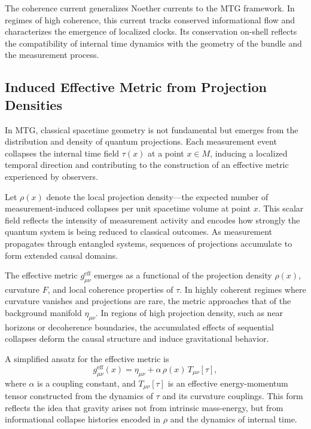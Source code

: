 \documentclass[11pt]{article}
\begin{document}
The coherence current generalizes Noether currents to the MTG framework. In regimes of high coherence, this current tracks conserved informational flow and characterizes the emergence of localized clocks. Its conservation on-shell reflects the compatibility of internal time dynamics with the geometry of the bundle and the measurement process.


\subsection{Induced Effective Metric from Projection Densities}

In MTG, classical spacetime geometry is not fundamental but emerges from the distribution and density of quantum projections. Each measurement event collapses the internal time field \( \tau(x) \) at a point \( x \in M \), inducing a localized temporal direction and contributing to the construction of an effective metric experienced by observers.

Let \( \rho(x) \) denote the local projection density—the expected number of measurement-induced collapses per unit spacetime volume at point \( x \). This scalar field reflects the intensity of measurement activity and encodes how strongly the quantum system is being reduced to classical outcomes. As measurement propagates through entangled systems, sequences of projections accumulate to form extended causal domains.

The effective metric \( g_{\mu\nu}^{\text{eff}} \) emerges as a functional of the projection density \( \rho(x) \), curvature \( F \), and local coherence properties of \( \tau \). In highly coherent regimes where curvature vanishes and projections are rare, the metric approaches that of the background manifold \( \eta_{\mu\nu} \). In regions of high projection density, such as near horizons or decoherence boundaries, the accumulated effects of sequential collapses deform the causal structure and induce gravitational behavior.

A simplified ansatz for the effective metric is
\begin{equation}
g_{\mu\nu}^{\text{eff}}(x) = \eta_{\mu\nu} + \alpha \, \rho(x) \, T_{\mu\nu}[\tau],
\end{equation}
where \( \alpha \) is a coupling constant, and \( T_{\mu\nu}[\tau] \) is an effective energy-momentum tensor constructed from the dynamics of \( \tau \) and its curvature couplings. This form reflects the idea that gravity arises not from intrinsic mass-energy, but from informational collapse histories encoded in \( \rho \) and the dynamics of internal time.
\end{document}
